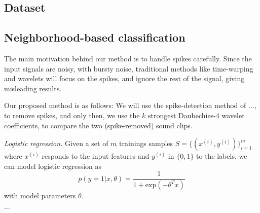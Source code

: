 \subsection{Dataset}

\subsection{Neighborhood-based classification}
The main motivation behind our method
is to handle spikes carefully.
Since the input signals are noisy, with bursty noise,
traditional methods like time-warping and wavelets
will focus on the spikes, and ignore the rest of the signal,
giving misleading results.

Our proposed method is as follows: 
We will use the spike-detection method of $\ldots$,
to remove spikes, and only then,  we use the $k$ strongest
Daubechies-4 wavelet coefficients, to compare the two (spike-removed)
sound clips.

\noindent
\textit{Logistic regression.} Given a set of $m$ trainings samples $S = \{ (x^{(i)}, y^{(i)}) \}_{i=1}^m$ where $x^{(i)}$ responds to the input features and $y^{(i)}$ in $\{ 0,1 \}$ to the labels, we can model logistic regression as
$$
p(y=1|x,\theta) = \frac{1}{1+\text{exp}(-\theta^T x)}
$$
with model parameters $\theta$.

$\ldots$


